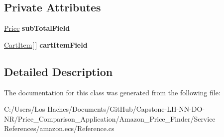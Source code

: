 \subsection*{Private Attributes}
\begin{DoxyCompactItemize}
\item 
\hypertarget{class_price___comparison_1_1amazon_1_1ecs_1_1_cart_items_acc0a5b6fc0b79af3d6ad249ddd3dfe07}{\hyperlink{class_price___comparison_1_1amazon_1_1ecs_1_1_price}{Price} {\bfseries sub\-Total\-Field}}\label{class_price___comparison_1_1amazon_1_1ecs_1_1_cart_items_acc0a5b6fc0b79af3d6ad249ddd3dfe07}

\item 
\hypertarget{class_price___comparison_1_1amazon_1_1ecs_1_1_cart_items_ac47ab3d7abfe264eadc8ddc21ae95018}{\hyperlink{class_price___comparison_1_1amazon_1_1ecs_1_1_cart_item}{Cart\-Item}\mbox{[}$\,$\mbox{]} {\bfseries cart\-Item\-Field}}\label{class_price___comparison_1_1amazon_1_1ecs_1_1_cart_items_ac47ab3d7abfe264eadc8ddc21ae95018}

\end{DoxyCompactItemize}


\subsection{Detailed Description}


The documentation for this class was generated from the following file\-:\begin{DoxyCompactItemize}
\item 
C\-:/\-Users/\-Los Haches/\-Documents/\-Git\-Hub/\-Capstone-\/\-L\-H-\/\-N\-N-\/\-D\-O-\/\-N\-R/\-Price\-\_\-\-Comparison\-\_\-\-Application/\-Amazon\-\_\-\-Price\-\_\-\-Finder/\-Service References/amazon.\-ecs/Reference.\-cs\end{DoxyCompactItemize}
